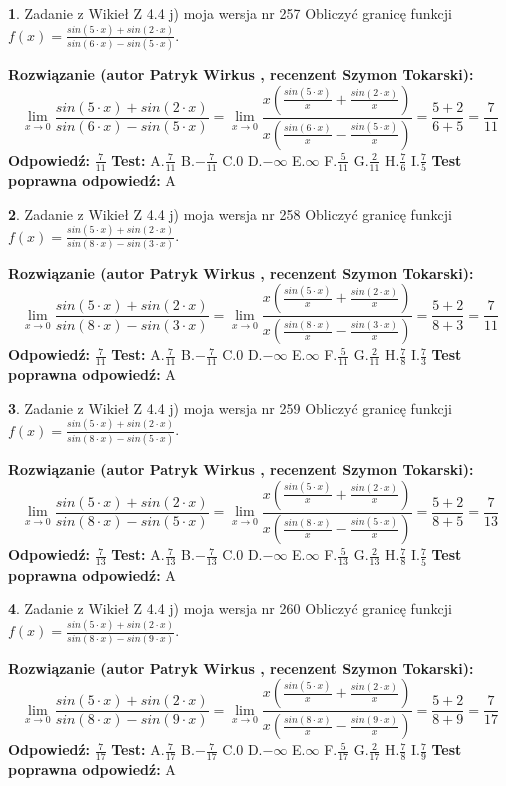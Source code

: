 \documentclass[12pt, a4paper]{article}
\theoremstyle{definition} %
\newtheorem{zad}{}
\newcommand{\zadStart}[1]{\begin{zad}#1\newline}
\newcommand{\zadStop}{\end{zad}}
\newcommand{\rozwStart}[2]{\noindent \textbf{Rozwiązanie (autor #1 , recenzent #2): }\newline}
\newcommand{\rozwStop}{\newline}
\newcommand{\odpStart}{\noindent \textbf{Odpowiedź:}\newline}
\newcommand{\odpStop}{\newline}
\newcommand{\testStart}{\noindent \textbf{Test:}\newline}
\newcommand{\testStop}{\newline}
\newcommand{\kluczStart}{\noindent \textbf{Test poprawna odpowiedź:}\newline}
\newcommand{\kluczStop}{\newline}
\begin{document}
\zadStart{Zadanie z Wikieł Z 4.4 j) moja wersja nr 257}
Obliczyć granicę funkcji $f(x)=\frac{sin(5\cdot x) +sin(2\cdot x)}{sin(6\cdot x) -sin(5\cdot x)}$.
\zadStop
\rozwStart{Patryk Wirkus}{Szymon Tokarski}
$$\lim\limits_{x\to 0}\frac{sin(5\cdot x) +sin(2\cdot x)}{sin(6\cdot x) -sin(5\cdot x)}=\lim\limits_{x\to 0}\frac{x(\frac{sin(5\cdot x)}{x}+\frac{sin(2\cdot x)}{x})}{x(\frac{sin(6\cdot x)}{x}-\frac{sin(5\cdot x)}{x})}=\frac{5+2}{6+5} = \frac{7}{11}$$
\rozwStop
\odpStart
$\frac{7}{11}$
\odpStop
\testStart
A.$\frac{7}{11}$
B.$-\frac{7}{11}$
C.$0$
D.$-\infty$
E.$\infty$
F.$\frac{5}{11}$
G.$\frac{2}{11}$
H.$\frac{7}{6}$
I.$\frac{7}{5}$
\testStop
\kluczStart
A
\kluczStop



\zadStart{Zadanie z Wikieł Z 4.4 j) moja wersja nr 258}
Obliczyć granicę funkcji $f(x)=\frac{sin(5\cdot x) +sin(2\cdot x)}{sin(8\cdot x) -sin(3\cdot x)}$.
\zadStop
\rozwStart{Patryk Wirkus}{Szymon Tokarski}
$$\lim\limits_{x\to 0}\frac{sin(5\cdot x) +sin(2\cdot x)}{sin(8\cdot x) -sin(3\cdot x)}=\lim\limits_{x\to 0}\frac{x(\frac{sin(5\cdot x)}{x}+\frac{sin(2\cdot x)}{x})}{x(\frac{sin(8\cdot x)}{x}-\frac{sin(3\cdot x)}{x})}=\frac{5+2}{8+3} = \frac{7}{11}$$
\rozwStop
\odpStart
$\frac{7}{11}$
\odpStop
\testStart
A.$\frac{7}{11}$
B.$-\frac{7}{11}$
C.$0$
D.$-\infty$
E.$\infty$
F.$\frac{5}{11}$
G.$\frac{2}{11}$
H.$\frac{7}{8}$
I.$\frac{7}{3}$
\testStop
\kluczStart
A
\kluczStop



\zadStart{Zadanie z Wikieł Z 4.4 j) moja wersja nr 259}
Obliczyć granicę funkcji $f(x)=\frac{sin(5\cdot x) +sin(2\cdot x)}{sin(8\cdot x) -sin(5\cdot x)}$.
\zadStop
\rozwStart{Patryk Wirkus}{Szymon Tokarski}
$$\lim\limits_{x\to 0}\frac{sin(5\cdot x) +sin(2\cdot x)}{sin(8\cdot x) -sin(5\cdot x)}=\lim\limits_{x\to 0}\frac{x(\frac{sin(5\cdot x)}{x}+\frac{sin(2\cdot x)}{x})}{x(\frac{sin(8\cdot x)}{x}-\frac{sin(5\cdot x)}{x})}=\frac{5+2}{8+5} = \frac{7}{13}$$
\rozwStop
\odpStart
$\frac{7}{13}$
\odpStop
\testStart
A.$\frac{7}{13}$
B.$-\frac{7}{13}$
C.$0$
D.$-\infty$
E.$\infty$
F.$\frac{5}{13}$
G.$\frac{2}{13}$
H.$\frac{7}{8}$
I.$\frac{7}{5}$
\testStop
\kluczStart
A
\kluczStop



\zadStart{Zadanie z Wikieł Z 4.4 j) moja wersja nr 260}
Obliczyć granicę funkcji $f(x)=\frac{sin(5\cdot x) +sin(2\cdot x)}{sin(8\cdot x) -sin(9\cdot x)}$.
\zadStop
\rozwStart{Patryk Wirkus}{Szymon Tokarski}
$$\lim\limits_{x\to 0}\frac{sin(5\cdot x) +sin(2\cdot x)}{sin(8\cdot x) -sin(9\cdot x)}=\lim\limits_{x\to 0}\frac{x(\frac{sin(5\cdot x)}{x}+\frac{sin(2\cdot x)}{x})}{x(\frac{sin(8\cdot x)}{x}-\frac{sin(9\cdot x)}{x})}=\frac{5+2}{8+9} = \frac{7}{17}$$
\rozwStop
\odpStart
$\frac{7}{17}$
\odpStop
\testStart
A.$\frac{7}{17}$
B.$-\frac{7}{17}$
C.$0$
D.$-\infty$
E.$\infty$
F.$\frac{5}{17}$
G.$\frac{2}{17}$
H.$\frac{7}{8}$
I.$\frac{7}{9}$
\testStop
\kluczStart
A
\kluczStop
\end{document}

